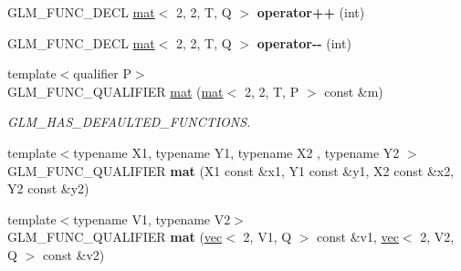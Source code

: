 \begin{DoxyCompactItemize}
\item 
\mbox{\label{structglm_1_1mat_3_012_00_012_00_01T_00_01Q_01_4_a35434d16d35db785027c0d3b8b9c78b7}} 
G\+L\+M\+\_\+\+F\+U\+N\+C\+\_\+\+D\+E\+CL \hyperlink{structglm_1_1mat}{mat}$<$ 2, 2, T, Q $>$ {\bfseries operator++} (int)
\item 
\mbox{\label{structglm_1_1mat_3_012_00_012_00_01T_00_01Q_01_4_a281b447bee6e5873f04b693d7178da91}} 
G\+L\+M\+\_\+\+F\+U\+N\+C\+\_\+\+D\+E\+CL \hyperlink{structglm_1_1mat}{mat}$<$ 2, 2, T, Q $>$ {\bfseries operator-\/-\/} (int)
\item 
\mbox{\label{structglm_1_1mat_3_012_00_012_00_01T_00_01Q_01_4_a7f98af19f3129bd9f0d1dee5cfa81e34}} 
{\footnotesize template$<$qualifier P$>$ }\\G\+L\+M\+\_\+\+F\+U\+N\+C\+\_\+\+Q\+U\+A\+L\+I\+F\+I\+ER \hyperlink{structglm_1_1mat_3_012_00_012_00_01T_00_01Q_01_4_a7f98af19f3129bd9f0d1dee5cfa81e34}{mat} (\hyperlink{structglm_1_1mat}{mat}$<$ 2, 2, T, P $>$ const \&m)
\begin{DoxyCompactList}\small\item\em G\+L\+M\+\_\+\+H\+A\+S\+\_\+\+D\+E\+F\+A\+U\+L\+T\+E\+D\+\_\+\+F\+U\+N\+C\+T\+I\+O\+NS. \end{DoxyCompactList}\item 
\mbox{\label{structglm_1_1mat_3_012_00_012_00_01T_00_01Q_01_4_a4993a0e05a7fcadaff6c334dbdd0fb48}} 
{\footnotesize template$<$typename X1, typename Y1, typename X2 , typename Y2 $>$ }\\G\+L\+M\+\_\+\+F\+U\+N\+C\+\_\+\+Q\+U\+A\+L\+I\+F\+I\+ER {\bfseries mat} (X1 const \&x1, Y1 const \&y1, X2 const \&x2, Y2 const \&y2)
\item 
\mbox{\label{structglm_1_1mat_3_012_00_012_00_01T_00_01Q_01_4_a305beefd8f4d49fc9aecc3e5fdf887c2}} 
{\footnotesize template$<$typename V1, typename V2$>$ }\\G\+L\+M\+\_\+\+F\+U\+N\+C\+\_\+\+Q\+U\+A\+L\+I\+F\+I\+ER {\bfseries mat} (\hyperlink{structglm_1_1vec}{vec}$<$ 2, V1, Q $>$ const \&v1, \hyperlink{structglm_1_1vec}{vec}$<$ 2, V2, Q $>$ const \&v2)
\item 

\end{DoxyCompactItemize}

